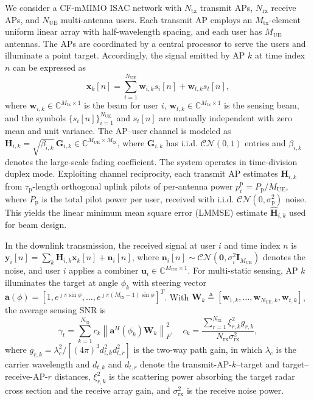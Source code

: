 \documentclass[letterpaper,journal]{IEEEtran}
\begin{document}
We consider a CF-mMIMO ISAC network with $N_{\mathrm{tx}}$ transmit APs, $N_{\mathrm{rx}}$ receive APs, and $N_{\mathrm{UE}}$ multi-antenna users. Each transmit AP employs an $M_{\mathrm{tx}}$-element uniform linear array with half-wavelength spacing, and each user has $M_{\mathrm{UE}}$ antennas. The APs are coordinated by a central processor to serve the users and illuminate a point target. Accordingly, the signal emitted by AP $k$ at time index $n$ can be expressed as
\begin{equation}
\mathbf{x}_k[n]=\sum_{i=1}^{N_{\mathrm{UE}}}\mathbf{w}_{i,k}s_i[n]+\mathbf{w}_{t,k}s_t[n],
\label{eq:xk}
\end{equation}
where $\mathbf{w}_{i,k}\in\mathbb{C}^{M_{\mathrm{tx}}\times 1}$ is the beam for user $i$, $\mathbf{w}_{t,k}\in\mathbb{C}^{M_{\mathrm{tx}}\times 1}$ is the sensing beam, and the symbols $\{s_i[n]\}_{i=1}^{N_{\mathrm{UE}}}$ and $s_t[n]$ are mutually independent with zero mean and unit variance. The AP--user channel is modeled as $\mathbf{H}_{i,k}=\sqrt{\beta_{i,k}}\,\mathbf{G}_{i,k}\in\mathbb{C}^{M_{\mathrm{UE}}\times M_{\mathrm{tx}}}$, where $\mathbf{G}_{i,k}$ has i.i.d. $\mathcal{CN}(0,1)$ entries and $\beta_{i,k}$ denotes the large-scale fading coefficient. The system operates in time-division duplex mode. Exploiting channel reciprocity, each transmit AP estimates $\mathbf{H}_{i,k}$ from $\tau_{\mathrm{p}}$-length orthogonal uplink pilots of per-antenna power $p_i^{\mathrm{p}}=P_{\mathrm{p}}/M_{\mathrm{UE}}$, where $P_{\mathrm{p}}$ is the total pilot power per user, received with i.i.d. $\mathcal{CN}(0,\sigma_{\mathrm{p}}^2)$ noise. This yields the linear minimum mean square error (LMMSE) estimate $\widehat{\mathbf{H}}_{i,k}$ used for beam design.

In the downlink transmission, the received signal at user $i$ and time index $n$ is $\mathbf{y}_i[n]=\sum_k\mathbf{H}_{i,k}\mathbf{x}_k[n]+\mathbf{n}_i[n]$, where $\mathbf{n}_i[n]\sim\mathcal{CN}(\mathbf{0},\sigma_i^2\mathbf{I}_{M_{\mathrm{UE}}})$ denotes the noise, and user $i$ applies a combiner $\mathbf{u}_i\in\mathbb{C}^{M_{\mathrm{UE}}\times 1}$. For multi-static sensing, AP $k$ illuminates the target at angle $\phi_k$ with steering vector $\mathbf{a}(\phi)=[1,e^{\jmath\pi\sin\phi},\ldots,e^{\jmath\pi(M_{\mathrm{tx}}-1)\sin\phi}]^T$. With $\mathbf{W}_k\triangleq[\mathbf{w}_{1,k},\ldots,\mathbf{w}_{N_{\mathrm{UE}},k},\mathbf{w}_{t,k}]$, the average sensing SNR is
\begin{equation}
\gamma_t=\sum_{k=1}^{N_{\mathrm{tx}}}c_k\left\|\mathbf{a}^H(\phi_k)\mathbf{W}_k\right\|_F^2,\quad c_k=\frac{\sum_{r=1}^{N_{\mathrm{rx}}}\xi_{r,k}^2 g_{r,k}}{N_{\mathrm{rx}}\sigma_{\mathrm{rx}}^2},
\label{eq:snr-sensing}
\end{equation}
where $g_{r,k}=\lambda_c^2/[(4\pi)^3d_{t,k}^2d_{t,r}^2]$ is the two-way path gain, in which $\lambda_c$ is the carrier wavelength and $d_{t,k}$ and $d_{t,r}$ denote the transmit-AP-$k$--target and target--receive-AP-$r$ distances, $\xi_{r,k}^2$ is the scattering power absorbing the target radar cross section and the receive array gain, and $\sigma_{\mathrm{rx}}^2$ is the receive noise power.
\end{document}
